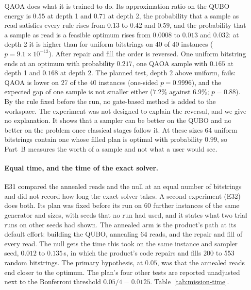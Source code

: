 \documentclass[11pt,a4paper]{article}
\begin{document}
QAOA does what it is trained to do. Its approximation ratio on the QUBO
energy is $0.55$ at depth 1 and $0.71$ at depth 2, the probability that a
sample as read satisfies every rule rises from $0.13$ to $0.42$ and $0.59$,
and the probability that a sample as read is a feasible optimum rises from
$0.0008$ to $0.013$ and $0.032$: at depth 2 it is higher than for uniform
bitstrings on 40 of 40 instances ($p = 9.1\times10^{-13}$). After repair
and fill the order is reversed. One uniform bitstring ends at an optimum
with probability $0.217$, one QAOA sample with $0.165$ at depth 1 and
$0.168$ at depth 2. The planned test, depth 2 above uniform, fails: QAOA is
lower on 27 of the 40 instances (one-sided $p = 0.9996$), and the expected
gap of one sample is not smaller either ($7.2\%$ against $6.9\%$;
$p = 0.88$). By the rule fixed before the run, no gate-based method is
added to the workspace. The experiment was not designed to explain the
reversal, and we give no explanation. It shows that a sampler can be better
on the QUBO and no better on the problem once classical stages follow it.
At these sizes 64 uniform bitstrings contain one whose filled plan is
optimal with probability $0.99$, so Part~B measures the worth of a sample
and not what a user would see.

\paragraph{Equal time, and the time of the exact solver.} E31 compared the
annealed reads and the null at an equal number of bitstrings and did not
record how long the exact solver takes. A second experiment (E32) does
both. Its plan was fixed before its run on 60 further instances of the same
generator and sizes, with seeds that no run had used, and it states what
two trial runs on other seeds had shown. The annealed arm is the product's
path at its default effort: building the QUBO, annealing 64 reads, and the
repair and fill of every read. The null gets the time this took on the same
instance and sampler seed, $0.012$ to $0.135$\,s, in which the product's
code repairs and fills 200 to 553 random bitstrings. The primary
hypothesis, at $0.05$, was that the annealed reads end closer to the
optimum. The plan's four other tests are reported unadjusted next to the
Bonferroni threshold $0.05/4 = 0.0125$. Table~\ref{tab:mission-time}.
\end{document}
